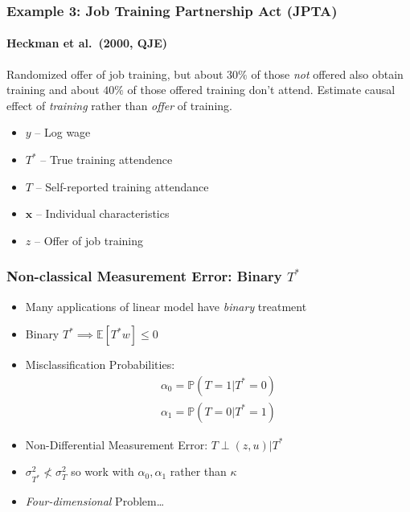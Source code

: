 \documentclass{beamer}
\begin{document}
\begin{frame}
  \frametitle{Example 3: Job Training Partnership Act (JPTA)}
\framesubtitle{Heckman et al.\ (2000, QJE)}
Randomized offer of job training, but about $30\%$ of those \emph{not} offered also obtain training and about $40\%$ of those offered training don't attend. Estimate causal effect of \emph{training} rather than \emph{offer} of training.

\begin{itemize}
  \item $y$ -- Log wage 
  \item $T^*$ -- True training attendence
  \item $T$ -- Self-reported training attendance
  \item $\mathbf{x}$ -- Individual characteristics
  \item $z$ -- Offer of job training
\end{itemize}
   
\end{frame}
\begin{frame}
  \frametitle{Non-classical Measurement Error: Binary $T^*$}
  \begin{itemize}
    \item Many applications of linear model have \emph{binary} treatment
    \item Binary $T^* \implies \mathbb{E}[T^*w]\leq0$
    \item Misclassification Probabilities:
      \begin{eqnarray*}
        \alpha_0 = \mathbb{P}(T=1|T^*=0)\\
        \alpha_1 = \mathbb{P}(T=0|T^*=1)
      \end{eqnarray*}
    \item Non-Differential Measurement Error: $T\perp (z,u)|T^*$
    \item  $\sigma_{T^*}^2 \nless \sigma_{T}^2$ so work with $\alpha_0, \alpha_1$ rather than $\kappa$ 
    \item \emph{Four-dimensional} Problem\ldots
  \end{itemize}
\end{frame}
\end{document}

